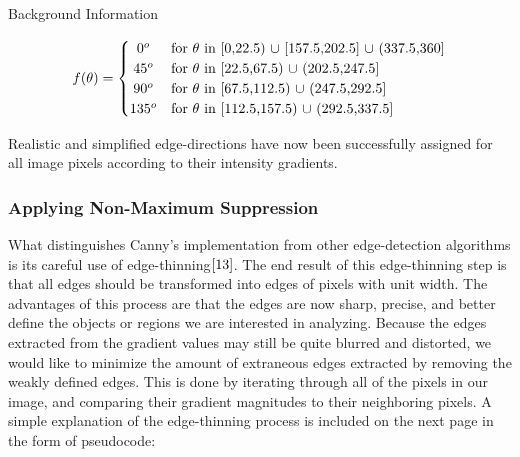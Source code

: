 \documentclass[a4paper,12pt]{article}
\begin{document}
\begin{section}{Background Information}
\singlespacing
\begin{center}
\[
f(\theta) = \left\{\def\arraystretch{1.2}%
  \begin{array}{@{}c@{\quad}l@{}}
	0^o & \text{for $\theta$ in [0,22.5) $\cup$ [157.5,202.5] $\cup$ (337.5,360]}\\
	45^o & \text{for $\theta$ in [22.5,67.5) $\cup$ (202.5,247.5]}\\
	90^o & \text{for $\theta$ in [67.5,112.5) $\cup$ (247.5,292.5]}\\
	135^o & \text{for $\theta$ in [112.5,157.5) $\cup$ (292.5,337.5]}\\
  \end{array}\right.
\]
\end{center} 
\doublespacing

Realistic and simplified edge-directions have now been successfully assigned for all image pixels according to their intensity gradients.

\subsubsection{Applying Non-Maximum Suppression}

What distinguishes Canny's implementation from other edge-detection algorithms is its careful use of edge-thinning$\cite{13}$.%
The end result of this edge-thinning step is that all edges should be transformed into edges of pixels with unit width.
The advantages of this process are that the edges are now sharp, precise, and better define the objects or regions we are interested in analyzing.
Because the edges extracted from the gradient values may still be quite blurred and distorted, we would like to minimize the amount of extraneous edges extracted by removing the weakly defined edges.
This is done by iterating through all of the pixels in our image, and comparing their gradient magnitudes to their neighboring pixels. 
A simple explanation of the edge-thinning process is included on the next page in the form of pseudocode:


\end{section}
\end{document}
